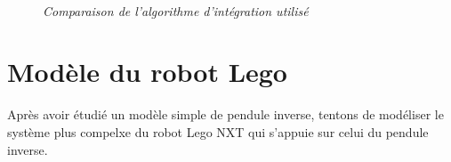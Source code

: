 \documentclass[11pt,french]{article} %
\begin{document}
\begin{figure}[H]%
	\centering
	\noindent{} \\
		\caption{\textit{Comparaison de l'algorithme d'intégration utilisé}}
		\label{fig:courbes_capteurs}%
\end{figure}
\vspace{0.5cm}


\newpage
\section{Modèle du robot Lego}

\quad Après avoir étudié un modèle simple de pendule inverse, tentons de modéliser le système plus compelxe du robot Lego NXT qui s'appuie sur celui du pendule inverse. \\
\end{document}
